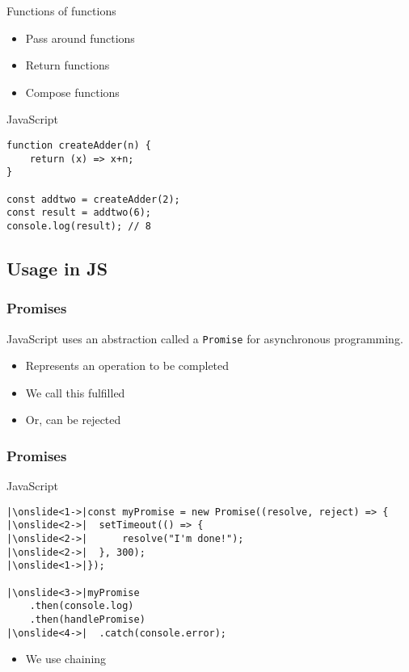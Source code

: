 \documentclass{beamer}
\begin{document}
\begin{frame}[fragile]{Functions of functions}
	\begin{itemize}
		\item Pass around functions
		\item Return functions
		\item Compose functions
	\end{itemize}
\begin{block}{JavaScript}
\begin{verbatim}
function createAdder(n) {
	return (x) => x+n;
}

const addtwo = createAdder(2);
const result = addtwo(6);
console.log(result); // 8
\end{verbatim}
\end{block}
\end{frame}

\subsection{Usage in JS}

\begin{frame}
	\frametitle{Promises}
	JavaScript uses an abstraction called a \alert{\texttt{Promise}} for
	asynchronous programming.

	\begin{itemize}
		\item Represents an operation to be completed
		\item We call this \alert{fulfilled}
		\item Or, can be \alert{rejected}
	\end{itemize}
\end{frame}

\begin{frame}[fragile]
	\frametitle{Promises}

	\begin{block}{JavaScript}
	\begin{verbatim}
|\onslide<1->|const myPromise = new Promise((resolve, reject) => {
|\onslide<2->|	setTimeout(() => {
|\onslide<2->|		resolve("I'm done!");
|\onslide<2->|	}, 300);
|\onslide<1->|});

|\onslide<3->|myPromise
	.then(console.log)
	.then(handlePromise)
|\onslide<4->|	.catch(console.error);
	\end{verbatim}
	\end{block}

	\begin{itemize}
		\item We use \alert{chaining}
	\end{itemize}
\end{frame}
\end{document}
